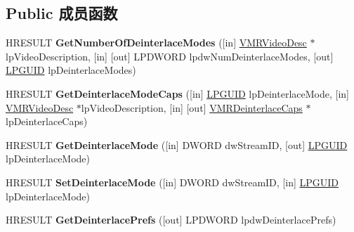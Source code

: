 \subsection*{Public 成员函数}
\begin{DoxyCompactItemize}
\item 
\mbox{\label{interface_i_v_m_r_deinterlace_control_a2670dbbf4b7edeb8741bf293803ef7e2}} 
H\+R\+E\+S\+U\+LT {\bfseries Get\+Number\+Of\+Deinterlace\+Modes} (\mbox{[}in\mbox{]} \hyperlink{struct___v_m_r_video_desc}{V\+M\+R\+Video\+Desc} $\ast$lp\+Video\+Description, \mbox{[}in\mbox{]} \mbox{[}out\mbox{]} L\+P\+D\+W\+O\+RD lpdw\+Num\+Deinterlace\+Modes, \mbox{[}out\mbox{]} \hyperlink{interface_g_u_i_d}{L\+P\+G\+U\+ID} lp\+Deinterlace\+Modes)
\item 
\mbox{\label{interface_i_v_m_r_deinterlace_control_a65b3eeb424e721254de645549db62723}} 
H\+R\+E\+S\+U\+LT {\bfseries Get\+Deinterlace\+Mode\+Caps} (\mbox{[}in\mbox{]} \hyperlink{interface_g_u_i_d}{L\+P\+G\+U\+ID} lp\+Deinterlace\+Mode, \mbox{[}in\mbox{]} \hyperlink{struct___v_m_r_video_desc}{V\+M\+R\+Video\+Desc} $\ast$lp\+Video\+Description, \mbox{[}in\mbox{]} \mbox{[}out\mbox{]} \hyperlink{struct___v_m_r_deinterlace_caps}{V\+M\+R\+Deinterlace\+Caps} $\ast$lp\+Deinterlace\+Caps)
\item 
\mbox{\label{interface_i_v_m_r_deinterlace_control_a204ceafb388a353453f3436895cc371e}} 
H\+R\+E\+S\+U\+LT {\bfseries Get\+Deinterlace\+Mode} (\mbox{[}in\mbox{]} D\+W\+O\+RD dw\+Stream\+ID, \mbox{[}out\mbox{]} \hyperlink{interface_g_u_i_d}{L\+P\+G\+U\+ID} lp\+Deinterlace\+Mode)
\item 
\mbox{\label{interface_i_v_m_r_deinterlace_control_ab2bc03321527d0dcdf36a117872a8acc}} 
H\+R\+E\+S\+U\+LT {\bfseries Set\+Deinterlace\+Mode} (\mbox{[}in\mbox{]} D\+W\+O\+RD dw\+Stream\+ID, \mbox{[}in\mbox{]} \hyperlink{interface_g_u_i_d}{L\+P\+G\+U\+ID} lp\+Deinterlace\+Mode)
\item 
\mbox{\label{interface_i_v_m_r_deinterlace_control_a2693283c3d61057d86de391847bda4e1}} 
H\+R\+E\+S\+U\+LT {\bfseries Get\+Deinterlace\+Prefs} (\mbox{[}out\mbox{]} L\+P\+D\+W\+O\+RD lpdw\+Deinterlace\+Prefs)

\end{DoxyCompactItemize}

